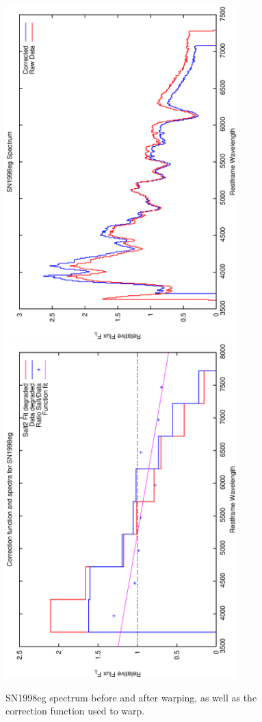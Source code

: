 \clearpage

\begin{figure}[p]
\centering
\includegraphics[angle=-90,width=0.8\textwidth]{./figures/spectrabeforeafter/SN1998eg_handpicked_v001_v023_before_after_spectra.ps}
\hfill
\includegraphics[angle=-90,width=0.8\textwidth]{./figures/corrections/SN1998eg_v001_correction.ps}
\hfill
\caption{SN1998eg spectrum before and after warping, as well as the correction function used to warp.}
\label{fig:SN1998egfour1}
\end{figure}


